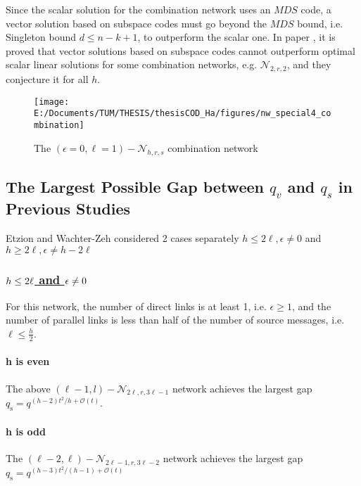 Since the scalar solution for the combination network uses an $MDS$
code, a vector solution based on subspace codes must go beyond the
$MDS$ bound, i.e. Singleton bound $d\leq n-k+1$, to outperform the
scalar one. In paper \cite[Sec. IV-A, Sec. IX-1,2]{Wachter-Zeh:2018},
it is proved that vector solutions based on subspace codes cannot
outperform optimal scalar linear solutions for some combination networks,
e.g. $\mathcal{N}_{2,r,2}$, and they conjecture it for all $h$.
\begin{figure}[H]
\caption{The $\left(\epsilon=0,\ell=1\right)-\mathcal{N}_{h,r,s}$ combination
network \label{fig:network_special4}}

\centering{}\texttt{[image: E:/Documents/TUM/THESIS/thesisCOD\_Ha/figures/nw\_special4\_combination]}
\end{figure}


\subsection{The Largest Possible Gap between $q_{v}$ and $q_{s}$ in Previous
Studies}

Etzion and Wachter-Zeh considered 2 cases separately $h\leq2\ell,\epsilon\neq0$
and $h\geq2\ell,\epsilon\neq h-2\ell$

\subsubsection{\uline{\mbox{$h\protect\leq2\ell$} and \mbox{$\epsilon\protect\neq0$}}}

For this network, the number of direct links is at least 1, i.e. $\epsilon\geq1$,
and the number of parallel links is less than half of the number of
source messages, i.e. $\ell\leq\frac{h}{2}$.

\paragraph{h is even}

The above $\left(\ell-1,l\right)-\mathcal{N}_{2\ell,r,3\ell-1}$ network
achieves the largest gap $q_{\mathrm{s}}=q^{(h-2)t^{2}/h+\mathcal{O}(t)}$.

\paragraph{h is odd}

The $\left(\ell-2,\ell\right)-\mathcal{N}_{2\ell-1,r,3\ell-2}$ network
achieves the largest gap $q_{\mathrm{s}}=q^{\left(h-3\right)t^{2}/\left(h-1\right)+\mathcal{O}(t)}$

